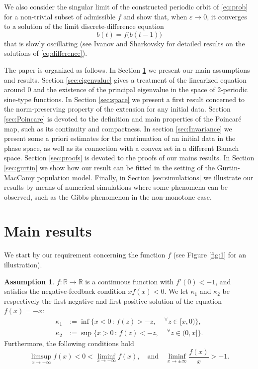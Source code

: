 \documentclass[a4paper,11pt]{article}
\theoremstyle{plain}
\theoremstyle{definition}
\newtheorem{assumption}{Assumption}[section]
\theoremstyle{definition}
\newcommand{\R}{\mathbb{R}}
\numberwithin{equation}{section}
\begin{document}
We also consider the singular limit of the constructed periodic orbit of \eqref{eq:prob} for a non-trivial subset of admissible $f$ and show that, when $\varepsilon\to 0$, it converges to a solution of the limit discrete-difference equation 
\begin{equation} \label{eq:difference}
    b(t) = f\big(b(t-1)\big) 
\end{equation}
that is slowly oscillating (see Ivanov and Sharkovsky \cite{Ivanov-Sharkovsky-1992} for detailed results on the solutions of \eqref{eq:difference}). 


The paper is organized as follows. In Section \ref{sec:main-results} we present our main assumptions and results. Section \ref{sec:eigenvalue} gives a treatment of the linearized equation around 0 and the existence of the principal eigenvalue in the space of 2-periodic sine-type functions. In Section \ref{sec:space} we present a first result concerned to the norm-preserving property of the extension for any initial data. Section \ref{sec:Poincare} is devoted to the definition and main properties of the Poincaré map, such as its continuity and compactness. In section \ref{sec:Invariance} we present some a priori estimates for the continuation of an initial data in the phase space, as well as its connection with a convex set in a different Banach space. Section \ref{sec:proofs} is devoted to the proofs of our mains results. In Section \ref{sec:gurtin} we show how our result can be fitted in the setting of the Gurtin-MacCamy population model. Finally, in Section \ref{sec:simulations} we illustrate our results by means of numerical simulations where some phenomena can be observed, such as the Gibbs phenomenon in the non-monotone case.

\section{Main results}
\label{sec:main-results}

We start by our requirement concerning the function $f$ (see Figure  \ref{fig:1} for an illustration).
\begin{assumption}\label{as:f}
    $f\colon \R\to\R$ is a continuous function with $f'(0)<-1$, and satisfies the negative-feedback condition $xf(x)<0$. We let $\kappa_1$ and $\kappa_2$ be respectively the first negative and first positive solution of the equation $f(x)=-x$:
    \begin{align*}
	\kappa_1&:=\inf\{x<0\,:\, f(z)>-z, \quad  \,^\forall z\in [x, 0)\}, \\ 
	\kappa_2&:=\sup\{x>0\,:\, f(z)<-z,\quad  \,^\forall z\in (0, x]\}. 
    \end{align*}
    Furthermore, the following conditions hold
\[
    \limsup_{x\to +\infty} f(x)<0<\liminf_{x\to-\infty} f(x), \quad \text{and} \quad \liminf_{x\to \pm \infty} \frac{f(x)}{x} > -1.
\]
\end{assumption}
\end{document}
